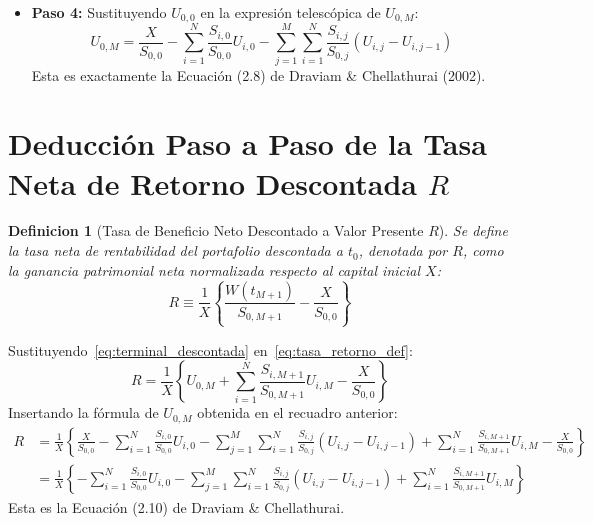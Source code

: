 \documentclass[11pt,a4paper]{report}
\newtheorem{definition}[theorem]{Definicion}
\numberwithin{equation}{chapter}
\begin{document}
\begin{demobox}
\begin{itemize}[leftmargin=1.5em]
    \item \textbf{Paso 4:} Sustituyendo $U_{0,0}$ en la expresión telescópica de $U_{0,M}$:
    \begin{equation}
        \boxed{U_{0,M} = \frac{X}{S_{0,0}} - \sum_{i=1}^N \frac{S_{i,0}}{S_{0,0}} U_{i,0} - \sum_{j=1}^M \sum_{i=1}^N \frac{S_{i,j}}{S_{0,j}} (U_{i,j} - U_{i,j-1})}
    \end{equation}
    Esta es exactamente la Ecuación (2.8) de Draviam \& Chellathurai (2002).
\end{itemize}
\end{demobox}

\section{Deducción Paso a Paso de la Tasa Neta de Retorno Descontada $R$}

\begin{definition}[Tasa de Beneficio Neto Descontado a Valor Presente $R$]
Se define la tasa neta de rentabilidad del portafolio descontada a $t_0$, denotada por $R$, como la ganancia patrimonial neta normalizada respecto al capital inicial $X$:
\begin{equation}
    R \equiv \frac{1}{X} \left\{ \frac{W(t_{M+1})}{S_{0,M+1}} - \frac{X}{S_{0,0}} \right\} \label{eq:tasa_retorno_def}
\end{equation}
\end{definition}

Sustituyendo~\eqref{eq:terminal_descontada} en~\eqref{eq:tasa_retorno_def}:
\begin{equation}
    R = \frac{1}{X} \left\{ U_{0,M} + \sum_{i=1}^N \frac{S_{i,M+1}}{S_{0,M+1}} U_{i,M} - \frac{X}{S_{0,0}} \right\}
\end{equation}
Insertando la fórmula de $U_{0,M}$ obtenida en el recuadro anterior:
\begin{align}
    R &= \frac{1}{X} \left\{ \frac{X}{S_{0,0}} - \sum_{i=1}^N \frac{S_{i,0}}{S_{0,0}} U_{i,0} - \sum_{j=1}^M \sum_{i=1}^N \frac{S_{i,j}}{S_{0,j}} (U_{i,j} - U_{i,j-1}) + \sum_{i=1}^N \frac{S_{i,M+1}}{S_{0,M+1}} U_{i,M} - \frac{X}{S_{0,0}} \right\} \nonumber \\
    &= \frac{1}{X} \left\{ - \sum_{i=1}^N \frac{S_{i,0}}{S_{0,0}} U_{i,0} - \sum_{j=1}^M \sum_{i=1}^N \frac{S_{i,j}}{S_{0,j}} (U_{i,j} - U_{i,j-1}) + \sum_{i=1}^N \frac{S_{i,M+1}}{S_{0,M+1}} U_{i,M} \right\} \label{eq:R_desarrollo_1}
\end{align}
Esta es la Ecuación (2.10) de Draviam \& Chellathurai.
\end{document}

